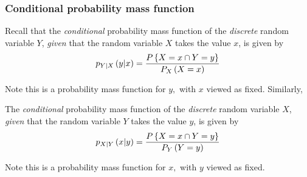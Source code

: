 \documentclass[notes=show,handout]{beamer}\usepackage[]{graphicx}\usepackage[]{color}
\renewcommand{\Pr}{P}
\begin{document}
\begin{frame}%

\frametitle{Conditional probability mass function}

Recall that the \emph{conditional} probability mass function of the \emph{discrete
}random variable $Y$, \emph{given} that the random variable $X$ takes the
value $x$, is given by%
\begin{equation*}
p_{Y|X}\left( y|x\right) =\frac{\Pr \left\{ X=x\cap Y=y\right\} }{%
P_{X}\left( X=x\right) }
\end{equation*}

Note this is a probability mass function for $y,$ with $x$ viewed as
fixed. Similarly,

\begin{definition}
The \emph{conditional} probability mass function of the
\emph{discrete }random variable $X$, \emph{given} that the random variable $%
Y $ takes the value $y$, is given by%
\begin{equation*}
p_{X|Y}\left( x|y\right) =\frac{\Pr \left\{ X=x\cap Y=y\right\} }{%
P_{Y}\left( Y=y\right) }
\end{equation*}
\end{definition}

Note this is a probability mass function for $x,$ with $y$ viewed as
fixed.

\end{frame}%
\end{document}
